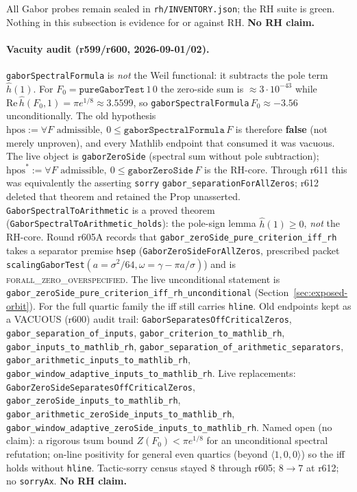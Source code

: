 \documentclass[11pt]{article}
\theoremstyle{definition}
\theoremstyle{remark}
\begin{document}
All Gabor probes remain sealed in \texttt{rh/INVENTORY.json}; the RH
suite is green.  Nothing in this subsection is evidence for or against
RH.  \textbf{No RH claim.}

\paragraph{Vacuity audit (r599/r600, 2026-09-01/02).}
\texttt{gaborSpectralFormula} is \emph{not} the Weil functional: it
subtracts the pole term $\hat h(1)$.  For $F_0=\texttt{pureGaborTest}\,1\,0$
the zero-side sum is $\approx 3\cdot 10^{-43}$ while
$\mathrm{Re}\,\hat h(F_0,1)=\pi e^{1/8}\approx 3.5599$, so
\texttt{gaborSpectralFormula}\,$F_0\approx -3.56$ unconditionally.
The old hypothesis $\mathrm{hpos}:=\forall F\text{ admissible},\ 0\le
\texttt{gaborSpectralFormula}\,F$ is therefore \textbf{false} (not merely
unproven), and every Mathlib endpoint that consumed it was vacuous.
The live object is \texttt{gaborZeroSide} (spectral sum without pole
subtraction); $\mathrm{hpos}^*:=\forall F\text{ admissible},\ 0\le
\texttt{gaborZeroSide}\,F$ is the RH-core.  Through r611 this was
equivalently the asserting \texttt{sorry}
\texttt{gabor\_separationForAllZeros}; r612 deleted that theorem and
retained the Prop unasserted.
\texttt{GaborSpectralToArithmetic} is a proved theorem
(\texttt{GaborSpectralToArithmetic\_holds}): the pole-sign lemma
$\hat h(1)\ge 0$, \emph{not} the RH-core.
Round r605A records that
\texttt{gabor\_zeroSide\_pure\_criterion\_iff\_rh} takes a separator
premise \texttt{hsep} (\texttt{GaborZeroSideForAllZeros}, prescribed
packet \texttt{scalingGaborTest}$(a=\sigma^2/64,\omega=\gamma-\pi a/\sigma)$)
and is \textsc{forall\_zero\_overspecified}.
The live unconditional statement is
\texttt{gabor\_zeroSide\_pure\_criterion\_iff\_rh\_unconditional}
(Section~\ref{sec:exposed-orbit}).
For the full quartic family the iff still carries \texttt{hline}.
Old endpoints kept as a VACUOUS (r600) audit trail:
\texttt{GaborSeparatesOffCriticalZeros},
\texttt{gabor\_separation\_of\_inputs},
\texttt{gabor\_criterion\_to\_mathlib\_rh},
\texttt{gabor\_inputs\_to\_mathlib\_rh},
\texttt{gabor\_separation\_of\_arithmetic\_separators},
\texttt{gabor\_arithmetic\_inputs\_to\_mathlib\_rh},
\texttt{gabor\_window\_adaptive\_inputs\_to\_mathlib\_rh}.
Live replacements:
\texttt{GaborZeroSideSeparatesOffCriticalZeros},
\texttt{gabor\_zeroSide\_inputs\_to\_mathlib\_rh},
\texttt{gabor\_arithmetic\_zeroSide\_inputs\_to\_mathlib\_rh},
\texttt{gabor\_window\_adaptive\_zeroSide\_inputs\_to\_mathlib\_rh}.
Named open (no claim): a rigorous tsum bound $Z(F_0)<\pi e^{1/8}$ for an
unconditional spectral refutation; on-line positivity for general even
quartics (beyond $\langle 1,0,0\rangle$) so the iff holds without
\texttt{hline}.  Tactic-sorry census stayed $8$ through r605; $8\to 7$ at r612; no \texttt{sorryAx}.
\textbf{No RH claim.}
\end{document}
